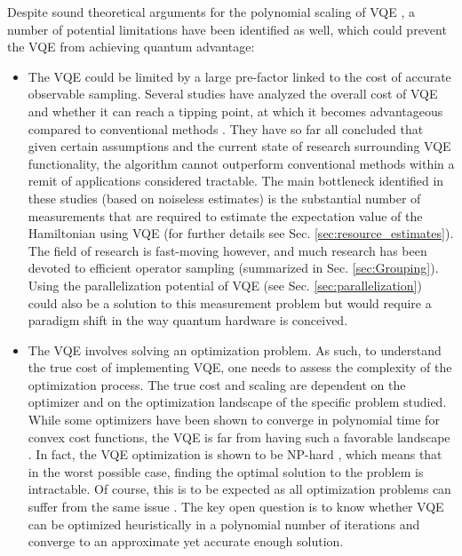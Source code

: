 Despite sound theoretical arguments for the polynomial scaling of VQE \cite{Peruzzo2014, mccleanTheoryVariationalHybrid2015}, a number of potential limitations have been identified as well, which could prevent the VQE from achieving quantum advantage:

\begin{itemize}
    \item The VQE could be limited by a large pre-factor linked to the cost of accurate observable sampling. Several studies have analyzed the overall cost of VQE and whether it can reach a tipping point, at which it becomes advantageous compared to conventional methods \cite{Wecker2015, Elfving2020, Gonthier2020}. They have so far all concluded that given certain assumptions and the current state of research surrounding VQE functionality, the algorithm cannot outperform conventional methods within a remit of applications considered tractable. The main bottleneck identified in these studies (based on noiseless estimates) is the substantial number of measurements that are required to estimate the expectation value of the Hamiltonian using VQE (for further details see Sec. \ref{sec:resource_estimates}). The field of research is fast-moving however, and much research has been devoted to efficient operator sampling (summarized in Sec. \ref{sec:Grouping}). Using the parallelization potential of VQE (see Sec. \ref{sec:parallelization}) could also be a solution to this measurement problem but would require a paradigm shift in the way quantum hardware is conceived.
    \item The VQE involves solving an optimization problem. As such, to understand the true cost of implementing VQE, one needs to assess the complexity of the optimization process. The true cost and scaling are dependent on the optimizer and on the optimization landscape of the specific problem studied. While some optimizers have been shown to converge in polynomial time for convex cost functions, the VQE is far from having such a favorable landscape \cite{Bittel2021, Anschuetz2022}. In fact, the VQE optimization is shown to be NP-hard \cite{Bittel2021}, which means that in the worst possible case, finding the optimal solution to the problem is intractable. Of course, this is to be expected as all optimization problems can suffer from the same issue \cite{Krentel1988}. The key open question is to know whether VQE can be optimized heuristically in a polynomial number of iterations and converge to an approximate yet accurate enough solution. 

\end{itemize}
